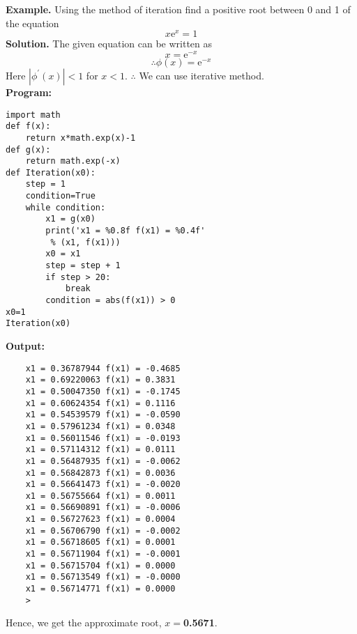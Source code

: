 \documentclass[12pt,a4paper,oneside]{book}
\begin{document}
\noindent
\textbf{Example.} Using the method of iteration find a positive root between 0 and 1 of the equation $$ x \mathrm{e}^x=1 $$
\textbf{Solution.}
The given equation can be written as $$x=\mathrm{e}^{-x}$$
$$\therefore \phi(x)=\mathrm{e}^{-x}$$
	 Here $\left|\phi^{\prime}(x)\right|<1$ for $x<1$. 
	 $\therefore$ We can use iterative method.\\
	\noindent
\textbf{Program:}
\begin{lstlisting}
import math
def f(x):
	return x*math.exp(x)-1
def g(x):
	return math.exp(-x)
def Iteration(x0):
	step = 1
	condition=True
	while condition:
		x1 = g(x0)
		print('x1 = %0.8f f(x1) = %0.4f'
		 % (x1, f(x1)))
		x0 = x1
		step = step + 1
		if step > 20:
			break
		condition = abs(f(x1)) > 0
x0=1
Iteration(x0)
\end{lstlisting}
\textbf{Output:}
\begin{verbatim}
	x1 = 0.36787944 f(x1) = -0.4685
	x1 = 0.69220063 f(x1) = 0.3831
	x1 = 0.50047350 f(x1) = -0.1745
	x1 = 0.60624354 f(x1) = 0.1116
	x1 = 0.54539579 f(x1) = -0.0590
	x1 = 0.57961234 f(x1) = 0.0348
	x1 = 0.56011546 f(x1) = -0.0193
	x1 = 0.57114312 f(x1) = 0.0111
	x1 = 0.56487935 f(x1) = -0.0062
	x1 = 0.56842873 f(x1) = 0.0036
	x1 = 0.56641473 f(x1) = -0.0020
	x1 = 0.56755664 f(x1) = 0.0011
	x1 = 0.56690891 f(x1) = -0.0006
	x1 = 0.56727623 f(x1) = 0.0004
	x1 = 0.56706790 f(x1) = -0.0002
	x1 = 0.56718605 f(x1) = 0.0001
	x1 = 0.56711904 f(x1) = -0.0001
	x1 = 0.56715704 f(x1) = 0.0000
	x1 = 0.56713549 f(x1) = -0.0000
	x1 = 0.56714771 f(x1) = 0.0000
	>
\end{verbatim}
 Hence, we get the approximate root, $x=$\textbf{0.5671}.\\
\end{document}
